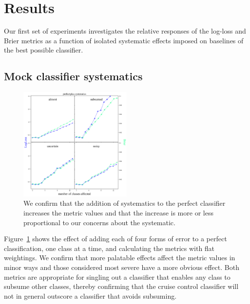 \section{Results}
\label{sec:results}

Our first set of experiments investigates the relative responses of the log-loss and Brier metrics as a function of isolated systematic effects imposed on baselines of the best possible classifier.

\subsection{Mock classifier systematics}
\label{sec:mockresults}

\begin{figure}
	\begin{center}
		\includegraphics[width=0.5\textwidth]{./fig/systematics_onlyperfect.png}
		\caption{We confirm that the addition of systematics to the perfect classifier increases the metric values and that the increase is more or less proportional to our concerns about the systematic.}
		\label{fig:cruise}
	\end{center}
\end{figure}

Figure~\ref{fig:cruise} shows the effect of adding each of four forms of error to a perfect classification, one class at a time, and calculating the metrics with flat weightings.
We confirm that more palatable effects affect the metric values in minor ways and those considered most severe have a more obvious effect.
Both metrics are appropriate for singling out a classifier that enables any class to subsume other classes, thereby confirming that the cruise control classifier will not in general outscore a classifier that avoids subsuming.

\begin{figure}
	\begin{center}
		\caption{}
		\label{fig:tunnel}
	\end{center}
\end{figure}

